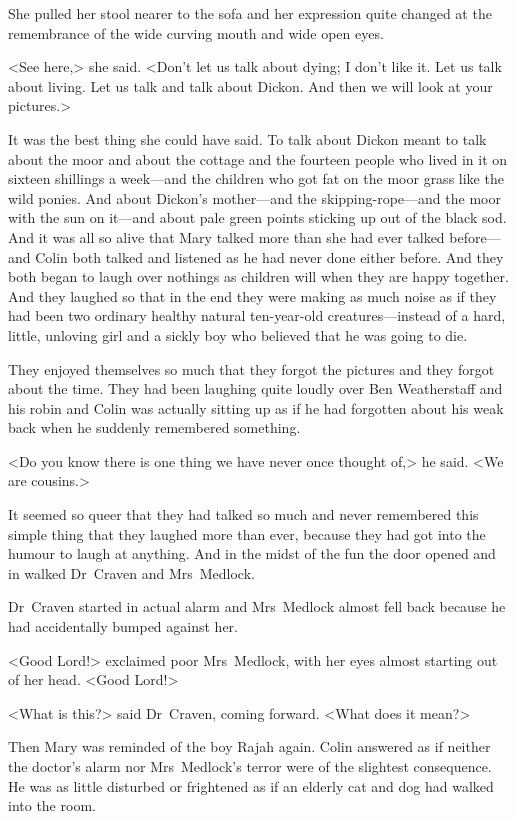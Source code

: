 She pulled her stool nearer to the sofa and her expression quite changed at the remembrance of the wide curving mouth and wide open eyes.

<See here,> she said. <Don't let us talk about dying; I don't like it. Let us talk about living. Let us talk and talk about Dickon. And then we will look at your pictures.>

It was the best thing she could have said. To talk about Dickon meant to talk about the moor and about the cottage and the fourteen people who lived in it on sixteen shillings a week—and the children who got fat on the moor grass like the wild ponies. And about Dickon's mother—and the skipping-rope—and the moor with the sun on it—and about pale green points sticking up out of the black sod. And it was all so alive that Mary talked more than she had ever talked before—and Colin both talked and listened as he had never done either before. And they both began to laugh over nothings as children will when they are happy together. And they laughed so that in the end they were making as much noise as if they had been two ordinary healthy natural ten-year-old creatures—instead of a hard, little, unloving girl and a sickly boy who believed that he was going to die.

They enjoyed themselves so much that they forgot the pictures and they forgot about the time. They had been laughing quite loudly over Ben Weatherstaff and his robin and Colin was actually sitting up as if he had forgotten about his weak back when he suddenly remembered something.

<Do you know there is one thing we have never once thought of,> he said. <We are cousins.>

It seemed so queer that they had talked so much and never remembered this simple thing that they laughed more than ever, because they had got into the humour to laugh at anything. And in the midst of the fun the door opened and in walked Dr~Craven and Mrs~Medlock.

Dr~Craven started in actual alarm and Mrs~Medlock almost fell back because he had accidentally bumped against her.

<Good Lord!> exclaimed poor Mrs~Medlock, with her eyes almost starting out of her head. <Good Lord!>

<What is this?> said Dr~Craven, coming forward. <What does it mean?>

Then Mary was reminded of the boy Rajah again. Colin answered as if neither the doctor's alarm nor Mrs~Medlock's terror were of the slightest consequence. He was as little disturbed or frightened as if an elderly cat and dog had walked into the room.

